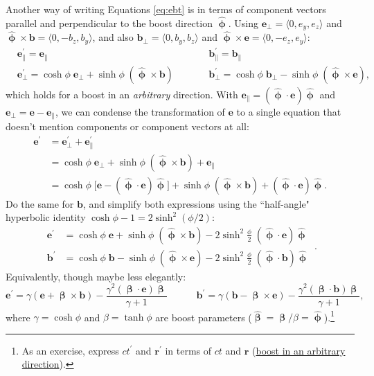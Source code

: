 \documentclass[12pt]{article}
\renewcommand{\vv}[1]{\mathbf{#1}}
\newcommand{\vvbeta}{\bm{\upbeta}}
\newcommand{\hatbeta}{\bm{\hat{\upbeta}}}
\newcommand{\hatphi}{\bm{\hat{\upphi}}}
\begin{document}
Another way of writing Equations \ref{eq:ebt} is in terms of component vectors parallel and perpendicular to the boost direction $\hatphi$. Using $\vv e_\perp = \langle 0, e_y, e_z \rangle$ and $\hatphi \times \vv b = \langle 0, -b_z, b_y \rangle$, and also $\vv b_\perp = \langle 0, b_y, b_z \rangle$ and $\hatphi \times \vv e = \langle 0, -e_z, e_y \rangle$:
\begin{equation*}
\begin{aligned}
& \vv e^\prime_\parallel = \vv e_\parallel  \qquad \qquad& & \vv b^\prime_\parallel = \vv b_\parallel  \\
& \vv e^\prime_\perp =  \cosh{\phi} \; \vv e_\perp  +  \sinh{\phi} \; ( \hatphi \times \vv b )   \qquad& & \vv b^\prime_\perp = \cosh{\phi} \; \vv b_\perp  - \sinh{\phi} \; ( \hatphi \times \vv e ) ,
\end{aligned}
\end{equation*}
which holds for a boost in an \emph{arbitrary} direction. With $\vv e_\parallel = (\hatphi \cdot \vv e) \hatphi$ and $\vv e_\perp = \vv e - \vv e_\parallel$, we can condense the transformation of $\vv e$ to a single equation that doesn't mention components or component vectors at all:
\begin{equation*}
\begin{split}
\vv e^\prime &= \vv e^\prime_\perp  + \vv e^\prime_\parallel \\
&= \cosh{\phi} \; \vv e_\perp  +  \sinh{\phi} \; ( \hatphi \times \vv b ) + \vv e_\parallel \\
&= \cosh{\phi} \; \big[ \vv e - (\hatphi \cdot \vv e) \hatphi \big] + \sinh{\phi} \; (\hatphi \times \vv b) + (\hatphi \cdot \vv e) \hatphi .
\end{split}
\end{equation*}
Do the same for $\vv b$, and simplify both expressions using the ``half-angle" hyperbolic identity $\cosh{\phi} - 1 = 2 \sinh^2{(\phi/2)}$:
\begin{equation}\label{eq:ebr}
\boxed{
\begin{aligned}
\vv e^\prime &= \cosh{\phi} \; \vv e + \sinh{\phi} \; (\hatphi \times \vv b) - 2 \sinh^2 \frac{\phi}{2} \; (\hatphi \cdot \vv e) \hatphi \\[4pt]
\vv b^\prime &= \cosh{\phi} \; \vv b - \sinh{\phi} \; (\hatphi \times \vv e) - 2 \sinh^2 \frac{\phi}{2} \; (\hatphi \cdot \vv b) \hatphi 
\end{aligned}
} \, .
\end{equation}
Equivalently, though maybe less elegantly:
\begin{equation*}
\vv e^\prime = \gamma \left( \vv e + \vvbeta \times \vv b \right) - \dfrac{\gamma^2 (\vvbeta \cdot \vv e) \vvbeta}{\gamma + 1} \qquad \quad \vv b^\prime = \gamma \left( \vv b - \vvbeta \times \vv e \right) - \dfrac{\gamma^2 (\vvbeta \cdot \vv b) \vvbeta}{\gamma + 1},
\end{equation*}
where $\gamma = \cosh{\phi}$ and $\beta = \tanh{\phi}$ are boost parameters ($\hatbeta = \vvbeta / \beta = \hatphi$).\footnote{As an exercise, express $ct^\prime$ and $\vv r^\prime$ in terms of $ct$ and $\vv r$ (\href{https://en.wikipedia.org/wiki/Lorentz_transformation\#Vector_transformations}{boost in an arbitrary direction}).}
\end{document}
